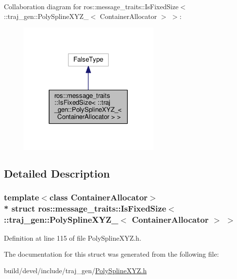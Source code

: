 Collaboration diagram for ros\+:\+:message\+\_\+traits\+:\+:Is\+Fixed\+Size$<$ \+:\+:traj\+\_\+gen\+:\+:Poly\+Spline\+X\+Y\+Z\+\_\+$<$ Container\+Allocator $>$ $>$\+:
\nopagebreak
\begin{figure}[H]
\begin{center}
\leavevmode
\includegraphics[width=201pt]{structros_1_1message__traits_1_1_is_fixed_size_3_01_1_1traj__gen_1_1_poly_spline_x_y_z___3_01_co6519299b09b1df68b3a2a6d06f00228c}
\end{center}
\end{figure}


\subsection{Detailed Description}
\subsubsection*{template$<$class Container\+Allocator$>$\\*
struct ros\+::message\+\_\+traits\+::\+Is\+Fixed\+Size$<$ \+::traj\+\_\+gen\+::\+Poly\+Spline\+X\+Y\+Z\+\_\+$<$ Container\+Allocator $>$ $>$}



Definition at line 115 of file Poly\+Spline\+X\+Y\+Z.\+h.



The documentation for this struct was generated from the following file\+:\begin{DoxyCompactItemize}
\item 
build/devel/include/traj\+\_\+gen/\hyperlink{_poly_spline_x_y_z_8h}{Poly\+Spline\+X\+Y\+Z.\+h}\end{DoxyCompactItemize}
